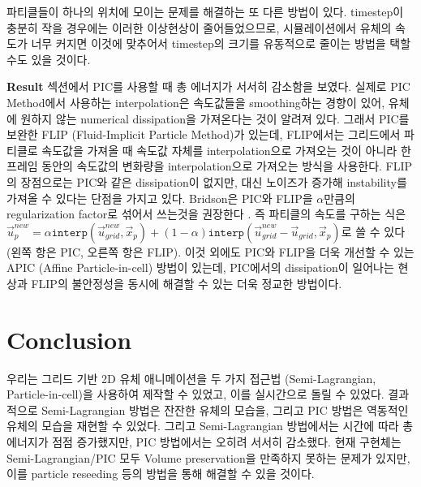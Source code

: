 \documentclass[12pt, A4]{article}
\begin{document}
파티클들이 하나의 위치에 모이는 문제를 해결하는 또 다른 방법이 있다. timestep이 충분히 작을 경우에는 이러한 이상현상이 줄어들었으므로, 시뮬레이션에서 유체의 속도가 너무 커지면 이것에 맞추어서 timestep의 크기를 유동적으로 줄이는 방법을 택할 수도 있을 것이다.

\textbf{Result} 섹션에서 PIC를 사용할 때 총 에너지가 서서히 감소함을 보였다. 실제로 PIC Method에서 사용하는 interpolation은 속도값들을 smoothing하는 경향이 있어, 유체에 원하지 않는 numerical dissipation을 가져온다는 것이 알려져 있다. 그래서 PIC를 보완한 FLIP (Fluid-Implicit Particle Method)가 있는데, FLIP에서는 그리드에서 파티클로 속도값을 가져올 때 속도값 자체를 interpolation으로 가져오는 것이 아니라 한 프레임 동안의 속도값의 변화량을 interpolation으로 가져오는 방식을 사용한다. FLIP의 장점으로는 PIC와 같은 dissipation이 없지만, 대신 노이즈가 증가해 instability를 가져올 수 있다는 단점을 가지고 있다. Bridson은 PIC와 FLIP을 $\alpha$만큼의 regularization factor로 섞어서 쓰는것을 권장한다 \cite[p. 118]{fluid-sim-cg}. 즉 파티클의 속도를 구하는 식은 $\vec{u}_p^{new} = \alpha \texttt{interp}(\vec{u}_{grid}^{new}, \vec{x}_p) + (1 - \alpha) \texttt{interp}(\vec{u}_{grid}^{new} - \vec{u}_{grid}, \vec{x}_p)$로 쓸 수 있다 (왼쪽 항은 PIC, 오른쪽 항은 FLIP). 이것 외에도 PIC와 FLIP을 더욱 개선할 수 있는 APIC (Affine Particle-in-cell) 방법이 있는데, PIC에서의 dissipation이 일어나는 현상과 FLIP의 불안정성을 동시에 해결할 수 있는 더욱 정교한 방법이다. \cite{apic}

\section{Conclusion}

우리는 그리드 기반 2D 유체 애니메이션을 두 가지 접근법 (Semi-Lagrangian, Particle-in-cell)을 사용하여 제작할 수 있었고, 이를 실시간으로 돌릴 수 있었다. 결과적으로 Semi-Lagrangian 방법은 잔잔한 유체의 모습을, 그리고 PIC 방법은 역동적인 유체의 모습을 재현할 수 있었다. 그리고 Semi-Lagrangian 방법에서는 시간에 따라 총 에너지가 점점 증가했지만, PIC 방법에서는 오히려 서서히 감소했다. 현재 구현체는 Semi-Lagrangian/PIC 모두 Volume preservation을 만족하지 못하는 문제가 있지만, 이를 particle reseeding 등의 방법을 통해 해결할 수 있을 것이다.

\newpage 
\end{document}
